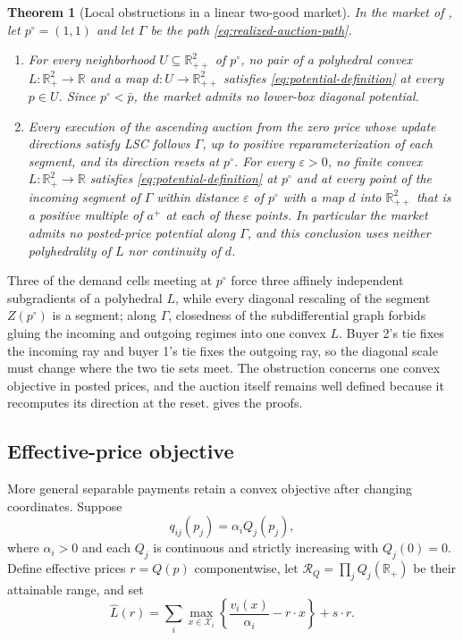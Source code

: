 \documentclass[11pt,a4paper,fleqn]{article}
\theoremstyle{plain}
\newtheorem{theorem}{Theorem}
\theoremstyle{definition}
\newcommand{\R}{\mathbb{R}}
\newcommand{\Xcal}{\mathcal{X}}
\newcommand{\eps}{\varepsilon}
\begin{document}
\begin{theorem}[Local obstructions in a linear two-good market]\label{thm:lower-path}
In the market of , let $p^\circ=(1,1)$ and let $\Gamma$ be the path \eqref{eq:realized-auction-path}.
\begin{enumerate}[label=(\roman*),leftmargin=2.2em]
\item For every neighborhood $U\subseteq\R_{++}^2$ of $p^\circ$, no pair of a polyhedral convex $L:\R_+^2\to\R$ and a map $d:U\to\R_{++}^2$ satisfies \eqref{eq:potential-definition} at every $p\in U$. Since $p^\circ<\bar p$, the market admits no lower-box diagonal potential.
\item Every execution of the ascending auction from the zero price whose update directions satisfy LSC follows $\Gamma$, up to positive reparameterization of each segment, and its direction resets at $p^\circ$. For every $\eps>0$, no finite convex $L:\R_+^2\to\R$ satisfies \eqref{eq:potential-definition} at $p^\circ$ and at every point of the incoming segment of $\Gamma$ within distance $\eps$ of $p^\circ$ with a map $d$ into $\R_{++}^2$ that is a positive multiple of $a^+$ at each of these points. In particular the market admits no posted-price potential along $\Gamma$, and this conclusion uses neither polyhedrality of $L$ nor continuity of $d$.
\end{enumerate}
\end{theorem}

Three of the demand cells meeting at $p^\circ$ force three affinely independent subgradients of a polyhedral $L$, while every diagonal rescaling of the segment $Z(p^\circ)$ is a segment; along $\Gamma$, closedness of the subdifferential graph forbids gluing the incoming and outgoing regimes into one convex $L$. Buyer 2's tie fixes the incoming ray and buyer 1's tie fixes the outgoing ray, so the diagonal scale must change where the two tie sets meet. The obstruction concerns one convex objective in posted prices, and the auction itself remains well defined because it recomputes its direction at the reset.  gives the proofs.

\subsection{Effective-price objective}\label{subsec:effective-objective}

More general separable payments retain a convex objective after changing coordinates. Suppose
\begin{equation}\label{eq:general-separable}
q_{ij}(p_j)=\alpha_iQ_j(p_j),
\end{equation}
where $\alpha_i>0$ and each $Q_j$ is continuous and strictly increasing with $Q_j(0)=0$. Define effective prices $r=Q(p)$ componentwise, let $\mathcal R_Q=\prod_j Q_j(\R_+)$ be their attainable range, and set
\begin{equation}\label{eq:Lhat}
\widehat L(r)=
\sum_i\max_{x\in\Xcal_i}
\left\{\frac{v_i(x)}{\alpha_i}-r\cdot x\right\}
+s\cdot r.
\end{equation}
\end{document}
